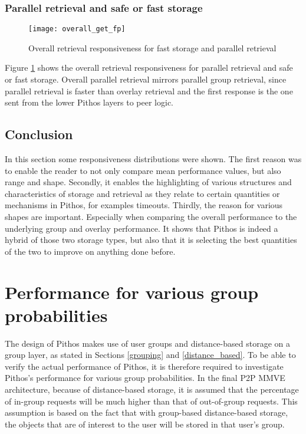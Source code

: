 \subsubsection{Parallel retrieval and safe or fast storage}
\begin{figure}[htbp]
 \centering
 \texttt{[image: overall\_get\_fp]}
 \caption{Overall retrieval responsiveness for fast storage and parallel retrieval}
 \label{fig_overall_get_fp}
\end{figure}
%
Figure \ref{fig_overall_get_fp} shows the overall retrieval responsiveness for parallel retrieval and safe or fast storage. Overall parallel retrieval mirrors parallel group retrieval, since parallel retrieval is faster than overlay retrieval and the first response is the one sent from the lower Pithos layers to peer logic.

\subsection{Conclusion}

In this section some responsiveness distributions were shown. The first reason was to enable the reader to not only compare mean performance values, but also range and shape. Secondly, it enables the highlighting of various structures and characteristics of storage and retrieval as they relate to certain quantities or mechanisms in Pithos, for examples timeouts. Thirdly, the reason for various shapes are important. Especially when comparing the overall performance to the underlying group and overlay performance. It shows that Pithos is indeed a hybrid of those two storage types, but also that it is selecting the best quantities of the two to improve on anything done before.

\section{Performance for various group probabilities}

The design of Pithos makes use of user groups and distance-based storage on a group layer, as stated in Sections \ref{grouping} and \ref{distance_based}. To be able to verify the actual performance of Pithos, it is therefore required to investigate Pithos's performance for various group probabilities. In the final P2P MMVE architecture, because of distance-based storage, it is assumed that the percentage of in-group requests will be much higher than that of out-of-group requests. This assumption is based on the fact that with group-based distance-based storage, the objects that are of interest to the user will be stored in that user's group.

